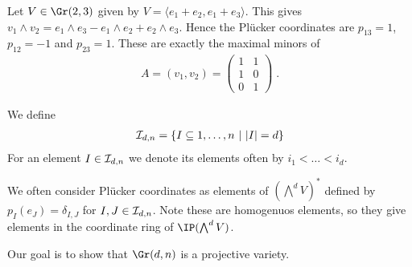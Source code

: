 \documentclass{skript}
\begin{document}
\begin{bsp}
    Let $V\in \Gr(2,3)$ given by $V = \langle e_1+e_2, e_1+e_3\rangle$. 
    This gives $v_1\wedge v_2 = e_1\wedge e_3 - e_1\wedge e_2 + e_2\wedge e_3$. 
    Hence the Plücker coordinates are $p_{13} = 1$, $p_{12} = -1$ and $p_{23} = 1$.
    These are exactly the maximal minors of
    \begin{align*}
        A = (v_1, v_2) = \begin{pmatrix} 1 &1\\ 1 &0 \\0 & 1\end{pmatrix}\;.
    \end{align*}
\end{bsp}

\begin{definition}
    We define
    \begin{align*}
        \mathcal{I}_{d,n} = \left\{I\subseteq {1,\dots, n} \ \middle|\  |I| = d\right\}
    \end{align*}
    For an element $I\in \mathcal{I}_{d,n}$ we denote its elements often by $i_1 <\dots < i_d$.
\end{definition}

We often consider Plücker coordinates as elements of $\left(\bigwedge^d V\right)^*$ defined by $p_I(e_J) = \delta_{I,J}$ for $I,J\in \mathcal{I}_{d,n}$. 
Note these are homogenuos elements, so they give elements in the coordinate ring of $\IP(\bigwedge^d V)$.

Our goal is to show that $\Gr(d,n)$ is a projective variety.
\end{document}
